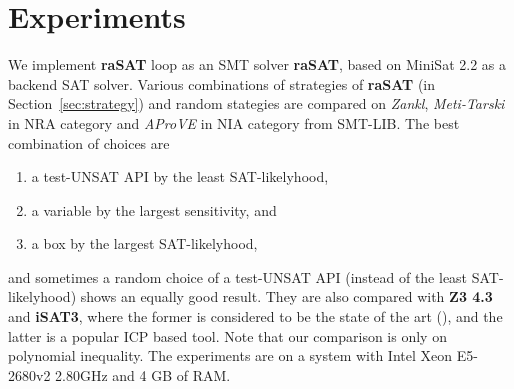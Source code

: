 \documentclass[runningheads,a4paper,oribibl]{llncs}
\begin{document}

\section{Experiments} \label{sec:experiment}

We implement \textbf{raSAT} loop as an SMT solver {\bf raSAT}, 
based on MiniSat 2.2 as a backend SAT solver. 
Various combinations of strategies of {\bf raSAT} (in Section~\ref{sec:strategy})
and random stategies are compared on {\em Zankl}, {\em Meti-Tarski} in NRA category 
and {\em AProVE} in NIA category from SMT-LIB. 
The best combination of choices are 
\begin{enumerate}
\item a test-UNSAT API by the least SAT-likelyhood, 
\item a variable by the largest sensitivity, and 
\item a box by the largest SAT-likelyhood, 
\end{enumerate} 
and sometimes a random choice of a test-UNSAT API (instead of the least SAT-likelyhood) 
shows an equally good result. 
They are also compared with \textbf{Z3 4.3} and \textbf{iSAT3}, 
where the former is considered to be the state of the art (\cite{Jovanovic13}), and 
the latter is a popular ICP based tool. 
Note that our comparison is only on polynomial inequality. 
The experiments are on a system with Intel Xeon E5-2680v2 2.80GHz and 4 GB of RAM. 
\end{document}

